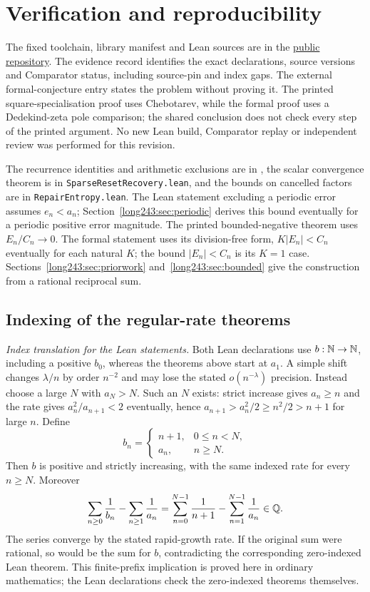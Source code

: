 \documentclass[11pt]{article}
\begin{document}
\appendix
\section{Verification and reproducibility}\label{long243:app:index}

\evidenceparagraph{\evidencerecordurl}
The fixed toolchain, library manifest and Lean sources are in the
\href{\sourceurl}{public repository}. The evidence record identifies
the exact declarations, source versions and Comparator status, including
source-pin and index gaps. The external formal-conjecture entry states
the problem without proving it. The printed square-specialisation proof
uses Chebotarev, while the formal proof uses a Dedekind-zeta pole comparison;
the shared conclusion does not check every step of the printed argument.
No new Lean build, Comparator replay or independent review was performed
for this revision.


The recurrence identities
and arithmetic exclusions are in , the
scalar convergence theorem is in \texttt{SparseResetRecovery.lean}, and
the bounds on cancelled factors are in \texttt{RepairEntropy.lean}.
The Lean statement excluding a periodic error assumes $e_n<a_n$;
Section~\ref{long243:sec:periodic} derives this bound eventually for a
periodic positive error magnitude. The printed bounded-negative theorem uses $E_n/C_n\to0$. The
formal statement uses its division-free form, $K|E_n|<C_n$ eventually
for each natural $K$; the bound $|E_n|<C_n$ is its $K=1$ case.
Sections~\ref{long243:sec:priorwork} and~\ref{long243:sec:bounded} give the
construction from a rational reciprocal sum.

\subsection*{Indexing of the regular-rate theorems}
\noindent\emph{Index translation for the Lean statements.} Both Lean
declarations use $b:\mathbb{N}\to\mathbb{N}$, including a positive $b_0$, whereas the
theorems above start at $a_1$. A simple shift changes $\lambda/n$ by
order $n^{-2}$ and may lose the stated $o(n^{-\lambda})$ precision.
Instead choose a
large $N$ with $a_N>N$. Such an $N$ exists: strict increase gives
$a_n\ge n$ and the rate gives $a_n^2/a_{n+1}<2$ eventually, hence
$a_{n+1}>a_n^2/2\ge n^2/2>n+1$ for large $n$. Define
\[
 b_n=\begin{cases}n+1,&0\le n<N,\\a_n,&n\ge N.\end{cases}
\]
Then $b$ is positive and strictly increasing, with the same indexed rate
for every $n\ge N$. Moreover
\[
 \sum_{n\ge0}\frac1{b_n}-\sum_{n\ge1}\frac1{a_n}
 =\sum_{n=0}^{N-1}\frac1{n+1}-\sum_{n=1}^{N-1}\frac1{a_n}\in\mathbb{Q}.
\]
The series converge by the stated rapid-growth rate. If the original
sum were rational, so would be the sum for $b$, contradicting the
corresponding zero-indexed Lean theorem. This finite-prefix implication
is proved here in ordinary mathematics; the Lean declarations check the
zero-indexed theorems themselves.
\end{document}
